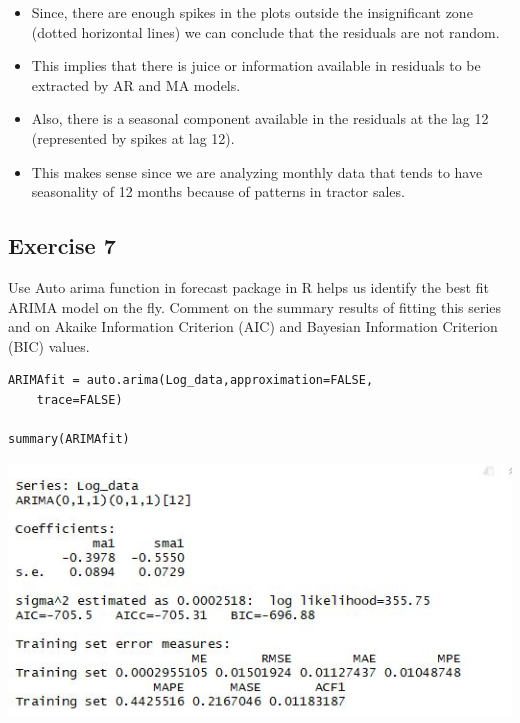 \documentclass[a4paper,12pt]{article}
\begin{document}
\begin{itemize}
\item Since, there are enough spikes in the plots outside the insignificant zone (dotted horizontal lines) we
can conclude that the residuals are not random. 
\item This implies that there is juice or information available
in residuals to be extracted by AR and MA models.
\item Also, there is a seasonal component available in
the residuals at the lag 12 (represented by spikes at lag 12).
\item This makes sense since we are analyzing
monthly data that tends to have seasonality of 12 months because of patterns in tractor sales.
\end{itemize}

\newpage 

\subsection*{Exercise 7}
\noindent Use Auto arima function in forecast package in R helps us identify the best fit ARIMA
model on the fly. Comment on the summary results of fitting this series and on Akaike
Information Criterion (AIC) and Bayesian Information Criterion (BIC) values. 


\begin{framed}
\begin{verbatim}
ARIMAfit = auto.arima(Log_data,approximation=FALSE,
    trace=FALSE)

summary(ARIMAfit)
\end{verbatim}
\end{framed}

\includegraphics[scale=1.05]{00-B2/images/ModelSummary.JPG}
\end{document}
